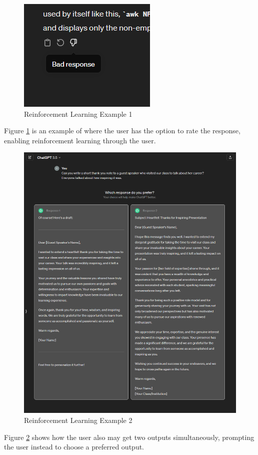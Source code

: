 \documentclass[12pt]{article}
\begin{document}
\begin{figure}[H]
    \centering
    \includegraphics[width=0.5\linewidth]{Images/RL1.png}
    \caption{Reinforcement Learning Example 1}
    \label{fig:RL1}
\end{figure}

Figure \ref{fig:RL1} is an example of where the user has the option to rate the response, enabling reinforcement learning through the user.

\begin{figure}[H]
    \centering
    \includegraphics[width=0.75\linewidth]{Images/RL2.png}
    \caption{Reinforcement Learning Example 2}
    \label{fig:RL2}
\end{figure}

Figure \ref{fig:RL2} shows how the user also may get two outputs simultaneously, prompting the user instead to choose a preferred output.
\end{document}
